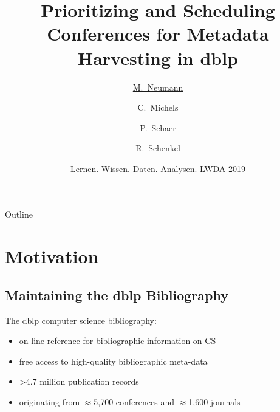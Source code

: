 \documentclass[xcolor={svgnames}]{beamer}
\title[Prioritizing Conferences for Harvesting] %
{Prioritizing and Scheduling Conferences for Metadata Harvesting in dblp}
\author[Mandy Neumann] %
{\underline{M.~Neumann\inst{1}} \and C.~Michels\inst{2} \and P.~Schaer\inst{1} \and R.~Schenkel\inst{2}}
\institute[TH K\"oln] %
{
  \inst{1}%
  Department of Information Science\\
  TH K\"oln (University of Applied Sciences)
  \and
  \inst{2}%
  Department of Computer Science\\
  University of Trier}
\date[LWDA 2019] %
{Lernen. Wissen. Daten. Analysen. LWDA 2019}
\makeatletter
\newcommand*{\currentname}{\@currentlabelname}
\makeatother
\begin{document}
\begin{frame}[plain]
  \titlepage
\end{frame}

\begin{frame}{Outline}
  \tableofcontents[subsectionstyle=hide]
\end{frame}





\section{Motivation}
\subsection{Maintaining the dblp Bibliography}
\begin{frame}{\currentname}\linespread{1.5}

The dblp computer science bibliography:

  \begin{itemize}
    \item on-line reference for bibliographic information on CS
    \item free access to high-quality bibliographic meta-data
    \item \textgreater 4.7 million publication records
    \item originating from \( \approx \)5,700 conferences and \( \approx \)1,600 journals
  \end{itemize}
\end{frame}
\end{document}
